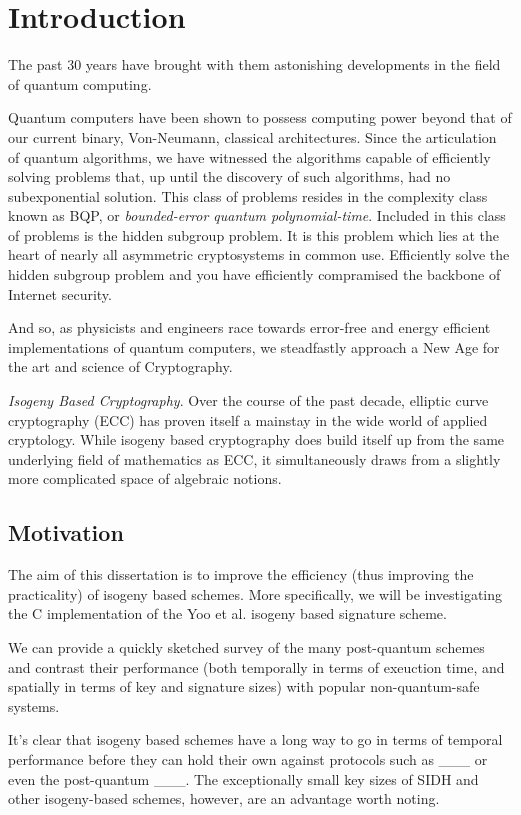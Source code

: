 \chapter{Introduction}

The past 30 years have brought with them astonishing developments in the field of quantum computing.

Quantum computers have been shown to possess computing power beyond that of our current binary, Von-Neumann, classical architectures. Since the articulation of quantum algorithms, we have witnessed the  algorithms capable of efficiently solving problems that, up until the discovery of such algorithms, had no subexponential solution. This class of problems resides in the complexity class known as BQP, or \textit{bounded-error quantum polynomial-time}. Included in this class of problems is the hidden subgroup problem. It is this problem which lies at the heart of nearly all asymmetric cryptosystems in common use. Efficiently solve the hidden subgroup problem and you have efficiently compramised the backbone of Internet security.  

And so, as physicists and engineers race towards error-free and energy efficient implementations of quantum computers, we steadfastly approach a New Age for the art and science of Cryptography. 


\textit{Isogeny Based Cryptography}. Over the course of the past decade, elliptic curve cryptography (ECC) has proven itself a mainstay in the wide world of applied cryptology. While isogeny based cryptography does build itself up from the same underlying field of mathematics as ECC, it simultaneously draws from a slightly more complicated space of algebraic notions.


\section{Motivation}
\label{sec:motivation}

The aim of this dissertation is to improve the efficiency (thus improving the practicality) of isogeny based schemes. More specifically, we will be investigating the C implementation of the Yoo et al. isogeny based signature scheme. 

We can provide a quickly sketched survey of the many post-quantum schemes and contrast their performance (both temporally in terms of exeuction time, and spatially in terms of key and signature sizes) with popular non-quantum-safe systems.

It's clear that isogeny based schemes have a long way to go in terms of temporal performance before they can hold their own against protocols such as \_\_\_ or even the post-quantum \_\_\_. The exceptionally small key sizes of SIDH and other isogeny-based schemes, however, are an advantage worth noting. 

